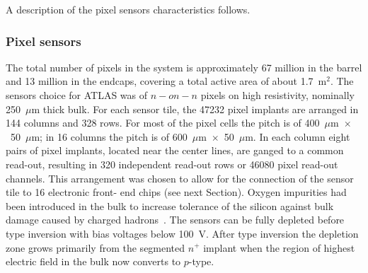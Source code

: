 A description of the pixel sensors characteristics follows.

\subsubsection{Pixel sensors}
\label{sec:pixelsensors}

The total number of pixels in the system is approximately 67 million in the barrel and 13 million in the endcaps, covering a total active area of about 1.7~m$^2$.
The  sensors  choice for ATLAS was of $n-on-n$ pixels on high resistivity, nominally 250~$\mu$m 
thick bulk. For each sensor tile, the 47232 pixel implants are arranged in 144 columns and 328 rows. 
For most of the pixel cells the pitch is of 	400~$\mu$m~$\times$~50~$\mu$m; in 16 columns 
the pitch is of 600~$\mu$m~$\times$~50~$\mu$m. In each column eight pairs of pixel implants, located 
near the center lines, are ganged to a common read-out, resulting in 320 independent read-out rows or 
46080 pixel read-out channels. This arrangement was chosen to allow for the connection of the sensor 
tile to 16 electronic front- end chips (see next Section). 
Oxygen impurities had been introduced in the bulk to increase tolerance of the silicon against bulk damage caused by charged hadrons~\cite{Lindstrom:421210,LINDSTROM200160}.
The sensors can be fully depleted before type inversion with bias voltages below 100~V. After type 
inversion the depletion zone grows primarily from the segmented $n^+$ implant when the region of 
highest electric field in the bulk now converts to $p$-type.

